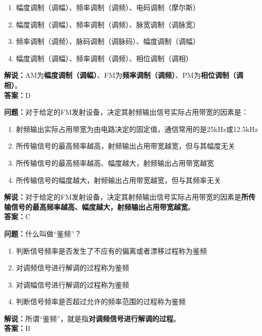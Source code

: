 \documentclass{ctexbook}
\begin{document}
\begin{enumerate}[label=\Alph*), leftmargin=3em]
	\item 幅度调制（调幅）、频率调制（调频）、电码调制（摩尔斯）
	\item 幅度调制（调幅）、频率调制（调频）、脉宽调制（调脉宽）
	\item 频率调制（调频）、脉码调制（调脉码）、幅度调制（调幅）
	\item 幅度调制（调幅）、频率调制（调频）、相位调制（调相）
\end{enumerate}

\noindent\textbf{解说：}AM为\textbf{幅度调制（调幅）}、FM为\textbf{频率调制（调频）}、PM为\textbf{相位调制（调相）}。\\\noindent\textbf{答案：}D%


\bigskip


\noindent\textbf{问题：}对于给定的FM发射设备，决定其射频输出信号实际占用带宽的因素是：

\begin{enumerate}[label=\Alph*), leftmargin=3em]
	\item 射频输出实际占用带宽为由电路决定的固定值，通信常用的是25kHz或12.5kHz
	\item 所传输信号的最高频率越高，射频输出占用带宽越宽，但与其幅度无关
	\item 所传输信号的最高频率越高、幅度越大，射频输出占用带宽越宽
	\item 所传输信号的幅度越大，射频输出占用带宽越宽，但与其频率无关
\end{enumerate}

\noindent\textbf{解说：}对于给定的FM发射设备，决定其射频输出信号实际占用带宽的因素是\textbf{所传输信号的最高频率越高、幅度越大，射频输出占用带宽越宽}。\\\noindent\textbf{答案：}C%


\bigskip


\noindent\textbf{问题：}什么叫做“鉴频”？

\begin{enumerate}[label=\Alph*), leftmargin=3em]
	\item 判断信号频率是否发生了不应有的偏离或者漂移过程称为鉴频
	\item 对调频信号进行解调的过程称为鉴频
	\item 对调幅信号进行解调的过程称为鉴频
	\item 判断信号频率是否超过允许的频率范围的过程称为鉴频
\end{enumerate}

\noindent\textbf{解说：}所谓“鉴频”，就是指\textbf{对调频信号进行解调的过程}。\\\noindent\textbf{答案：}B
\end{document}
